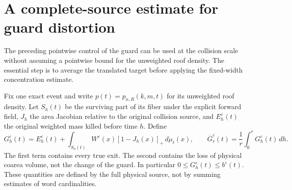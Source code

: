 \section{A complete-source estimate for guard distortion}
\label{sec:v78-averaged}
The preceding pointwise control of the guard can be used at the
collision scale without assuming a pointwise bound for the unweighted
roof density. The essential step is to average the translated target
before applying the fixed-width concentration estimate.

Fix one exact event and write $p(t)=p_{n,R}(k,m,t)$ for its
unweighted roof density. Let $S_h(t)$ be the surviving part of its
fiber under the explicit forward field, $J_h$ the area Jacobian
relative to the original collision source, and $E_h^\varepsilon(t)$
the original weighted mass killed before time $h$. Define
\begin{equation}\label{eq:v78-geometric-defect}
 G_h^\varepsilon(t)=E_h^\varepsilon(t)
       +\int_{S_h(t)}W^\varepsilon(x)[1-J_h(x)]_+\,d\mu_t(x),
 \qquad \overline G_r^\varepsilon(t)=\frac1r\int_0^rG_h^\varepsilon(t)\,dh.
\end{equation}
The first term contains every true exit. The second contains the
loss of physical coarea volume, not the change of the guard.
In particular $0\le G_h^\varepsilon(t)\le b^\varepsilon(t)$.
These quantities are defined by the full physical source, not by
summing estimates of word cardinalities.

